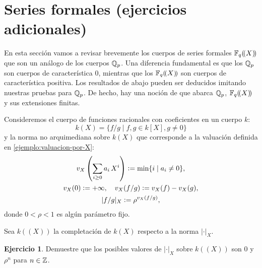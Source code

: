 \documentclass{article}
\numberwithin{equation}{section}
\theoremstyle{definition}
\newtheorem{ejerc}{Ejercicio}
\begin{document}
\section{Series formales (ejercicios adicionales)}

En esta sección vamos a revisar brevemente los cuerpos de series formales
$\mathbb{F}_q (\!(X)\!)$ que son un análogo de los cuerpos $\mathbb{Q}_p$. Una diferencia
fundamental es que los $\mathbb{Q}_p$ son cuerpos de característica $0$, mientras que
los $\mathbb{F}_q (\!(X)\!)$ son cuerpos de característica positiva. Los resultados
de abajo pueden ser deducidos imitando nuestras pruebas para $\mathbb{Q}_p$. De hecho,
hay una noción de  que abarca $\mathbb{Q}_p$,
$\mathbb{F}_q (\!(X)\!)$ y sus extensiones finitas.

\vspace{1em}

Consideremos el cuerpo de funciones racionales con coeficientes en un cuerpo
$k$:
$$k (X) = \{ f/g \mid f,g\in k [X], g\ne 0 \}$$
y la norma no arquimediana sobre $k (X)$ que corresponde a la valuación definida
en \ref{ejemplo:valuacion-por-X}:
\begin{gather*}
v_X \left(\sum_{i\ge 0} a_i\,X^i\right) \mathrel{\mathop:}= \min \{ i \mid a_i \ne 0 \},\\
v_X (0) \mathrel{\mathop:}= +\infty, \quad v_X (f/g) \mathrel{\mathop:}= v_X (f) - v_X (g),\\
|f/g|_X \mathrel{\mathop:}= \rho^{v_X (f/g)},
\end{gather*}
donde $0 < \rho < 1$ es algún parámetro fijo.

\vspace{1em}

Sea $k (\!(X)\!)$ la completación de $k (X)$ respecto a la norma $|\cdot|_X$.

\begin{ejerc}
  Demuestre que los posibles valores de $|\cdot|_X$ sobre $k (\!(X)\!)$ son $0$
  y $\rho^n$ para $n\in\mathbb{Z}$.
\end{ejerc}
\end{document}
